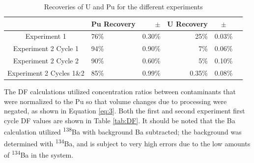 \documentclass[review]{elsarticle}
\newcommand{\tss}{\textsuperscript}
\begin{document}
\begin{table}[ht]
\caption{Recoveries of U and Pu for the different experiments}
\label{tab:UPu}
\centering
\begin{tabular}{rlrrrr}
  \hline
 \multicolumn{1}{|c|}{}& \multicolumn{1}{|c}{Pu Recovery} & $\pm$ & \multicolumn{1}{|c}{U Recovery} & \multicolumn{1}{c|}{$\pm$} \\ 
  \hline
   \multicolumn{1}{|c|}{Experiment 1}         & 76\%    & \multicolumn{1}{c|}{0.30\%} & 25\%    & \multicolumn{1}{c|}{0.03\%} \\ 
   \multicolumn{1}{|c|}{Experiment 2 Cycle 1} & 94\%    & \multicolumn{1}{c|}{0.90\%} & 7\%     & \multicolumn{1}{c|}{0.06\%} \\ 
   \multicolumn{1}{|c|}{Experiment 2 Cycle 2} & 90\%    & \multicolumn{1}{c|}{0.60\%} & 5\%     & \multicolumn{1}{c|}{0.10\%} \\ 
   \multicolumn{1}{|c|}{Experiment 2 Cycles 1\&2} & 85\% & \multicolumn{1}{c|}{0.99\%} &0.35\% & \multicolumn{1}{c|}{0.08\%} \\
   \hline
\end{tabular}
\end{table}


The DF calculations utilized concentration ratios between contaminants that were normalized
to the Pu so that volume changes due to processing were negated, as shown in Equation \ref{eq:3}. 
Both the first and second experiment first cycle DF values
are shown in Table \ref{tab:DF}. It should be noted that the Ba calculation 
utilized \tss{138}Ba with
background Ba subtracted; the background was 
determined with \tss{134}Ba, and is subject to very
high errors due to the low amounts of \tss{134}Ba in the system.
\end{document}
